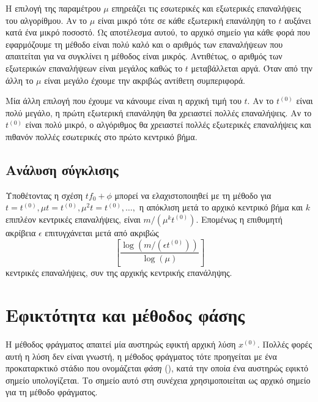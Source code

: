 Η επιλογή της παραμέτρου \( \mu \) επηρεάζει τις εσωτερικές και εξωτερικές
επαναλήψεις του αλγορίθμου. Αν το \( \mu \) είναι μικρό τότε σε κάθε εξωτερική
επανάληψη το \(t\) αυξάνει κατά ένα μικρό ποσοστό. Ως αποτέλεσμα αυτού, το
αρχικό σημείο για κάθε φορά που εφαρμόζουμε τη μέθοδο  είναι πολύ
καλό και ο αριθμός των επαναλήψεων που απαιτείται για να συγκλίνει η μέθοδος
 είναι μικρός. Αντιθέτως, ο αριθμός των εξωτερικών επαναλήψεων είναι
μεγάλος καθώς το \(t\) μεταβάλλεται αργά. Όταν από την άλλη το \( \mu \) είναι
μεγάλο έχουμε την ακριβώς αντίθετη συμπεριφορά.

Μία άλλη επιλογή που έχουμε να κάνουμε είναι η αρχική τιμή του \(t\). Αν το
\(t^{(0)}\) είναι πολύ μεγάλο, η πρώτη εξωτερική επανάληψη θα χρειαστεί πολλές
επαναλήψεις. Αν το \(t^{(0)}\) είναι πολύ μικρό, ο αλγόριθμος θα χρειαστεί
πολλές εξωτερικές επαναλήψεις και πιθανόν πολλές εσωτερικές στο πρώτο κεντρικό
βήμα.

\subsection{Ανάλυση σύγκλισης}
Υποθέτοντας η σχέση \( tf_0 + \phi \) μπορεί να ελαχιστοποιηθεί με τη μέθοδο
 για \( t = t^{(0)}, \mu t = t^{(0)}, \mu^2 t = t^{(0)}, \dots, \)
η απόκλιση μετά το αρχικό κεντρικό βήμα και \(k\) επιπλέον κεντρικές
επαναλήψεις, είναι \( m / (\mu^kt^{(0)}) \). Επομένως η επιθυμητή ακρίβεια
\(\epsilon\) επιτυγχάνεται μετά από ακριβώς
\begin{equation*}
    \left[ \dfrac{\log{(m / (\epsilon t^{(0)}))}} { \log{(\mu)}} \right]
\end{equation*}
κεντρικές επαναλήψεις, συν της αρχικής κεντρικής επανάληψης.

\section{Εφικτότητα και μέθοδος  φάσης}
Η μέθοδος φράγματος απαιτεί μία αυστηρώς εφικτή αρχική λύση \( x^{(0)} \).
Πολλές φορές αυτή η λύση δεν είναι γνωστή, η μέθοδος φράγματος τότε προηγείται
με ένα προκαταρκτικό στάδιο που ονομάζεται \emph{φάση } (),
κατά την οποία ένα αυστηρώς εφικτό σημείο υπολογίζεται. Το σημείο αυτό στη
συνέχεια χρησιμοποιείται ως αρχικό σημείο για τη μέθοδο φράγματος.

